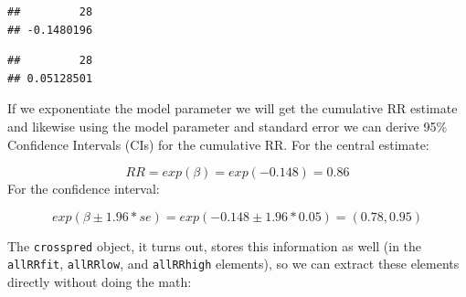 \documentclass[
]{book}
\newenvironment{Shaded}{\begin{snugshade}}{\end{snugshade}}
\newcommand{\DecValTok}[1]{\textcolor[rgb]{0.00,0.00,0.81}{#1}}
\newcommand{\DocumentationTok}[1]{\textcolor[rgb]{0.56,0.35,0.01}{\textbf{\textit{#1}}}}
\newcommand{\NormalTok}[1]{#1}
\newcommand{\SpecialCharTok}[1]{\textcolor[rgb]{0.81,0.36,0.00}{\textbf{#1}}}
\begin{document}
\begin{Shaded}
\end{Shaded}

\begin{verbatim}
##         28 
## -0.1480196
\end{verbatim}

\begin{Shaded}
\end{Shaded}

\begin{verbatim}
##         28 
## 0.05128501
\end{verbatim}

If we exponentiate the model parameter we will get the cumulative RR estimate and likewise using the model parameter and standard error we can derive 95\% Confidence Intervals (CIs) for the cumulative RR. For the central estimate:

\[
RR=exp(\beta)=exp(-0.148)=0.86
\]
For the confidence interval:

\[
exp(\beta \pm 1.96*se) = exp(-0.148 \pm 1.96*0.05) = (0.78, 0.95)
\]

The \texttt{crosspred} object, it turns out, stores this information as well (in the \texttt{allRRfit}, \texttt{allRRlow}, and \texttt{allRRhigh} elements), so we can extract these elements directly without doing the math:

\begin{Shaded}
\end{Shaded}
\end{document}
